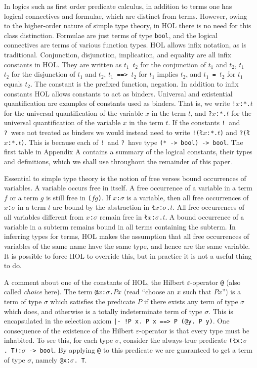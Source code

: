 In logics such as first order predicate calculus, in addition to terms
one has logical connectives and formulae, which are distinct from
terms.  However, owing to the higher-order nature of simple type
theory, in HOL there is no need for this class distinction.  Formulae
are just terms of type {\tt bool}, and the logical connectives are
terms of various function types.  HOL allows infix notation, as is
traditional.  Conjunction, disjunction, implication, and equality are
all infix constants in HOL.  They are written as
{\tt $t_1$ {\land} $t_2$} for the conjunction of $t_1$ and $t_2$,
{\tt $t_1$ {\lor} $t_2$} for the disjunction of $t_1$ and $t_2$,
{\tt $t_1$ ==> $t_2$} for $t_1$ implies $t_2$, and 
{\tt $t_1$ = $t_2$} for $t_1$ equals $t_2$. 
The constant {\tt \lnot} is the prefixed function, negation.
In addition to infix constants
HOL allows constants to act as binders.  Universal and existential
quantification are examples of constants used as binders.  That is,
we write 
{\tt !$x$:*.$t$} for the universal quantification of the variable $x$ in the
term $t$, and
{\tt ?$x$:*.$t$} for the universal quantification of the variable $x$ in the
term $t$.  If the constants {\tt !}\ and {\tt ?}\ were not treated as binders
we would instead need to write {\tt !({\l}$x$:*.$t$)} and
{\tt ?({\l}$x$:*.$t$)}.  This is because each of {\tt !}\ and {\tt ?}\ have
type {\tt (* -> bool) -> bool}.  The first table in Appendix A contains a
summary of the logical constants, their types and definitions, which we
shall use throughout the remainder of this paper.

Essential to simple type theory is the notion of free verses bound
occurrences of variables.  A variable occurs free in itself.  A free
occurrence of a variable in a term $f$ or a term $g$ is still free in
\mbox{\tt ($fg$)}.  If {\tt $x$:$\sigma$} is a variable, then all
free occurrences of {\tt $x$:$\sigma$} in a term $t$ are bound by the
abstraction in {\tt {\l}$x$:$\sigma$.$t$}.  All free occurrences of all
variables different from {\tt $x$:$\sigma$} remain free in
{\tt{\l}$x$:$\sigma$.$t$}.  A bound occurrence of a variable in a subterm
remains bound in all terms containing the subterm.  In inferring types
for terms, HOL makes the assumption that all free occurrences of
variables of the same name have the same type, and hence are the same
variable.  It is possible to force HOL to override this, but in
practice it is not a useful thing to do.

A comment about one of the constants of HOL, the Hilbert
$\varepsilon$-operator {\tt @} (also called {\it choice} here).  The
term {\tt @$x$:$\sigma$.$P x$} (read ``choose an $x$ such that $Px$'')
is a term of type $\sigma$ which satisfies the predicate $P$ if there exists
any term of type $\sigma$ which does, and otherwise
is a totally indeterminate term of type $\sigma$.  This is
encapsulated in the selection axiom {\tt |- !P x.~P x ==> P (@y.~P y)}.
One consequence of the existence of the Hilbert
$\varepsilon$-operator is that every type must be inhabited.  To see
this, for each type $\sigma$, consider the always-true predicate
\mbox{\tt ({\l}x:$\sigma$.~T):$\sigma$ -> bool}.  By applying
\mbox{\tt @} to this predicate we are
guaranteed to get a term of type $\sigma$, namely {\tt @x:$\sigma$.~T}.


